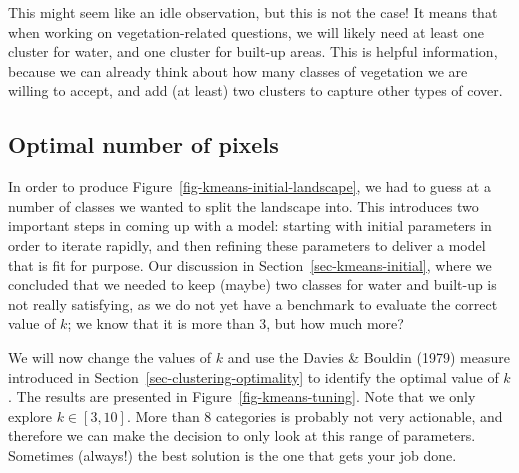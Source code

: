 \documentclass[
  letterpaper,
]{scrbook}
\begin{document}
This might seem like an idle observation, but this is not the case! It
means that when working on vegetation-related questions, we will likely
need at least one cluster for water, and one cluster for built-up areas.
This is helpful information, because we can already think about how many
classes of vegetation we are willing to accept, and add (at least) two
clusters to capture other types of cover.

\subsection{Optimal number of pixels}\label{optimal-number-of-pixels}


In order to produce Figure~\ref{fig-kmeans-initial-landscape}, we had to
guess at a number of classes we wanted to split the landscape into. This
introduces two important steps in coming up with a model: starting with
initial parameters in order to iterate rapidly, and then refining these
parameters to deliver a model that is fit for purpose. Our discussion in
Section~\ref{sec-kmeans-initial}, where we concluded that we needed to
keep (maybe) two classes for water and built-up is not really
satisfying, as we do not yet have a benchmark to evaluate the correct
value of \(k\); we know that it is more than 3, but how much more?

We will now change the values of \(k\) and use the Davies \& Bouldin
(1979) measure introduced in Section~\ref{sec-clustering-optimality} to
identify the optimal value of \(k\). The results are presented in
Figure~\ref{fig-kmeans-tuning}. Note that we only explore
\(k \in [3, 10]\). More than 8 categories is probably not very
actionable, and therefore we can make the decision to only look at this
range of parameters. Sometimes (always!) the best solution is the one
that gets your job done.
\end{document}
